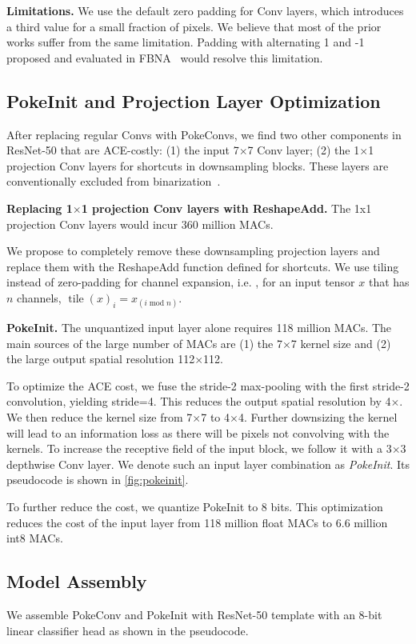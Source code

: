 \textbf{Limitations.}
We use the default zero padding for Conv layers, which introduces a third value for a small fraction of pixels. We believe that most of the prior works suffer from the same limitation. Padding with alternating 1 and -1 proposed and evaluated in FBNA~\cite{guo2018fbna} would resolve this limitation. 

\subsection{PokeInit and Projection Layer Optimization}
\label{sec:lightweight-layers}
After replacing regular Convs with PokeConvs, we find two other components in ResNet-50 that are ACE-costly: (1) the input 7$\times$7 Conv layer; (2) the 1$\times$1 projection Conv layers for shortcuts in downsampling blocks. These layers are conventionally excluded from binarization~\cite{liu2021sabnn}.

\textbf{Replacing 1$\times$1 projection Conv layers with ReshapeAdd.} The 1x1 projection Conv layers would incur 360 million MACs.

We propose to completely remove these downsampling projection layers and replace them with the ReshapeAdd function defined for shortcuts. We use tiling instead of zero-padding for channel expansion, i.e. , for an input tensor $x$ that has $n$ channels, $\operatorname{tile}(x)_i = x_{(i \operatorname{mod} n)}$.

\textbf{PokeInit.}
The unquantized input layer alone requires 118 million MACs. The main sources of the large number of MACs are (1) the 7$\times$7 kernel size and (2) the large output spatial resolution 112$\times$112.

To optimize the ACE cost, we fuse the stride-2 max-pooling with the first stride-2 convolution, yielding stride=4. This reduces the output spatial resolution by 4$\times$. We then reduce the kernel size from 7$\times$7 to 4$\times$4. Further downsizing the kernel will lead to an information loss as there will be pixels not convolving with the kernels. To increase the receptive field of the input block, we follow it with a 3$\times$3 depthwise Conv layer. We denote such an input layer combination as \textit{PokeInit}. 
Its pseudocode is shown in \ref{fig:pokeinit}. 

To further reduce the cost, we quantize PokeInit to 8 bits. This optimization reduces the cost of the input layer from 118 million float MACs to 6.6 million int8 MACs. 

\subsection{Model Assembly} We assemble PokeConv and PokeInit with ResNet-50 template with an 8-bit linear classifier head as shown in the pseudocode.

